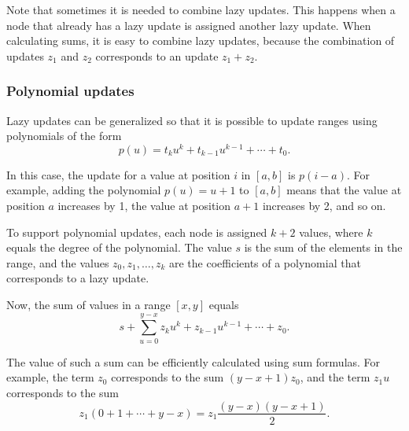\begin{center}
\end{center}

Note that sometimes it is needed to combine lazy updates.
This happens when a node that already has a lazy update
is assigned another lazy update.
When calculating sums, it is easy to combine lazy updates,
because the combination of updates $z_1$ and $z_2$
corresponds to an update $z_1+z_2$.

\subsubsection{Polynomial updates}

Lazy updates can be generalized so that it is
possible to update ranges using polynomials of the form
\[p(u) = t_k u^k + t_{k-1} u^{k-1} + \cdots + t_0.\]

In this case, the update for a value
at position $i$ in $[a,b]$ is $p(i-a)$.
For example, adding the polynomial $p(u)=u+1$
to $[a,b]$ means that the value at position $a$
increases by 1, the value at position $a+1$
increases by 2, and so on.

To support polynomial updates,
each node is assigned $k+2$ values,
where $k$ equals the degree of the polynomial.
The value $s$ is the sum of the elements in the range,
and the values $z_0,z_1,\ldots,z_k$ are the coefficients
of a polynomial that corresponds to a lazy update.

Now, the sum of values in a range $[x,y]$ equals
\[s+\sum_{u=0}^{y-x} z_k u^k + z_{k-1} u^{k-1} + \cdots + z_0.\]

The value of such a sum
can be efficiently calculated using sum formulas.
For example, the term $z_0$ corresponds to the sum
$(y-x+1)z_0$, and the term $z_1 u$ corresponds to the sum
\[z_1(0+1+\cdots+y-x) = z_1 \frac{(y-x)(y-x+1)}{2} .\]

